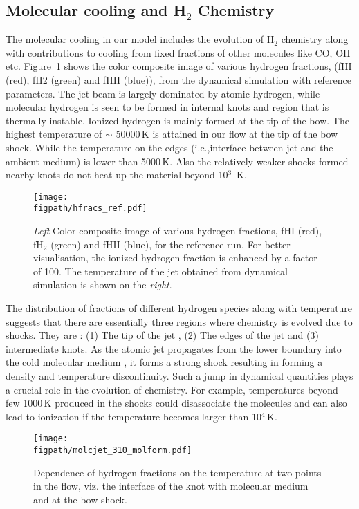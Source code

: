 \documentclass[useAMS,usenatbib]{mn2e}
\newcommand{\figpath}{/Users/bhargavvaidya/MyProject/work/Leeds_Uni/SiOJets_New/PAPER/PFIGS/}
\begin{document}
\subsection{Molecular cooling and H$_2$ Chemistry}
The molecular cooling in our
model includes the evolution of H$_2$ chemistry along with
contributions to cooling from fixed fractions of other molecules like
CO, OH etc. Figure~\ref{fig:Hfracsim} shows the color composite image
of various hydrogen fractions, (fHI (red), fH2 (green) and fHII
(blue)), from the dynamical simulation with
reference parameters. The jet beam is largely dominated by atomic
hydrogen, while molecular hydrogen is seen to be formed in internal
knots and region that is thermally instable. 
Ionized hydrogen is mainly formed at the tip of the bow. 
The highest temperature of $\sim$ 50000\,K is attained in our flow at the
tip of the bow shock. While the temperature on the edges (i.e.,interface between
jet and the ambient medium) is lower than 5000\,K. Also the relatively
weaker shocks formed nearby knots do not heat up the material beyond
10$^{3}$\, K. 
%

\begin{figure}
 \texttt{[image: \\figpath/hfracs\_ref.pdf]}
 \caption{{\it{Left}} Color composite image of various hydrogen
   fractions, fHI (red), fH$_{2}$ (green) and fHII (blue), for the
   reference run. For better visualisation, the ionized hydrogen
   fraction is enhanced by a factor of 100. The temperature of the jet
 obtained from dynamical simulation is shown on the {\it{right}}.}
\label{fig:Hfracsim}
\end{figure}


The distribution of fractions of different hydrogen species along with
temperature suggests that there are essentially three regions where
chemistry is evolved due to shocks.
They are : (1) The tip of the jet , (2) The edges of the jet and
(3) intermediate knots. 
As the atomic jet propagates from the lower boundary 
into the cold molecular medium , it forms a strong shock resulting in
forming a density and temperature discontinuity. Such a jump in
dynamical quantities plays a crucial role in the evolution of
chemistry. For example, temperatures beyond few 1000\,K produced in the shocks could
disassociate the molecules and can also lead to ionization if
the temperature becomes larger than 10$^{4}$\,K.
%
\begin{figure*}
 \texttt{[image: \\figpath/molcjet\_310\_molform.pdf]}
 \caption{Dependence of hydrogen fractions on the temperature at two
   points in the flow, viz. the interface of the knot with molecular
   medium and at the bow shock.}
\label{fig:Hmolform}
\end{figure*}
\end{document}
